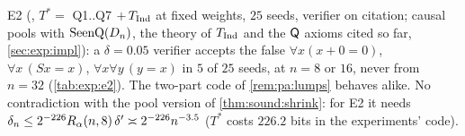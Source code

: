\begin{remark}\label{rem:sound:lumps}
E2 (\Lzero, $T^*=$ Q1..Q7 $+\,T_{\mathrm{Ind}}$ at fixed weights, $25$ seeds, verifier on citation; causal pools with $\mathrm{SeenQ}(D_n)$, the theory of $T_{\mathrm{Ind}}$ and the $\mathsf{Q}$ axioms cited so far, \cref{sec:exp:impl}): a $\delta=0.05$ verifier accepts the false $\forall x(x+0=0)$, $\forall x\,(Sx=x)$, $\forall x\forall y\,(y=x)$ in $5$ of $25$ seeds, at $n=8$ or $16$, never from $n=32$ (\cref{tab:exp:e2}). The two-part code of \cref{rem:pa:lumps} behaves alike. No contradiction with the pool version of \cref{thm:sound:shrink}: for E2 it needs $\delta_n\le2^{-226}R_{\alpha}(n,8)\,\delta'\asymp2^{-226}n^{-3.5}$ ($T^*$ costs $226.2$ bits in the experiments' code).
\end{remark}

